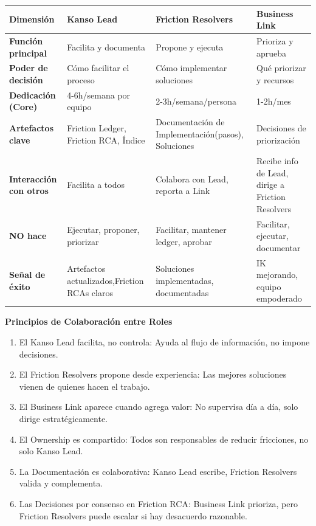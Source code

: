 \begin{center}
\scriptsize
\begin{tabular}{|p{2.5cm}|p{3.5cm}|p{3.5cm}|p{3.5cm}|}
\hline
\textbf{Dimensión} & \textbf{Kanso Lead} & \textbf{Friction Resolvers} & \textbf{Business Link} \\ \hline
\textbf{Función principal} & Facilita y documenta & Propone y ejecuta & Prioriza y aprueba \\ \hline
\textbf{Poder de decisión} & Cómo facilitar el proceso & Cómo implementar soluciones & Qué priorizar y recursos \\ \hline
\textbf{Dedicación (Core)} & 4-6h/semana por equipo & 2-3h/semana/persona & 1-2h/mes \\ \hline
\textbf{Artefactos clave} & Friction Ledger, Friction RCA, Índice & Documentación de Implementación(pasos), Soluciones & Decisiones de priorización \\ \hline
\textbf{Interacción con otros} & Facilita a todos & Colabora con Lead, reporta a Link & Recibe info de Lead, dirige a Friction Resolvers \\ \hline
\textbf{NO hace} & Ejecutar, proponer, priorizar & Facilitar, mantener ledger, aprobar & Facilitar, ejecutar, documentar \\ \hline
\textbf{Señal de éxito} & Artefactos actualizados,Friction RCAs claros & Soluciones implementadas, documentadas & IK mejorando, equipo empoderado \\ \hline
\end{tabular}
\end{center}

\textbf{Principios de Colaboración entre Roles}

\begin{enumerate}
    \item El Kanso Lead facilita, no controla: Ayuda al flujo de información, no impone decisiones.
    \item El Friction Resolvers propone desde experiencia: Las mejores soluciones vienen de quienes hacen el trabajo.
    \item El Business Link aparece cuando agrega valor: No supervisa día a día, solo dirige estratégicamente.
    \item El Ownership es compartido: Todos son responsables de reducir fricciones, no solo Kanso Lead.
    \item La Documentación es colaborativa: Kanso Lead escribe, Friction Resolvers valida y complementa.
    \item Las Decisiones por consenso en Friction RCA: Business Link prioriza, pero Friction Resolvers puede escalar si hay desacuerdo razonable.
\end{enumerate}

